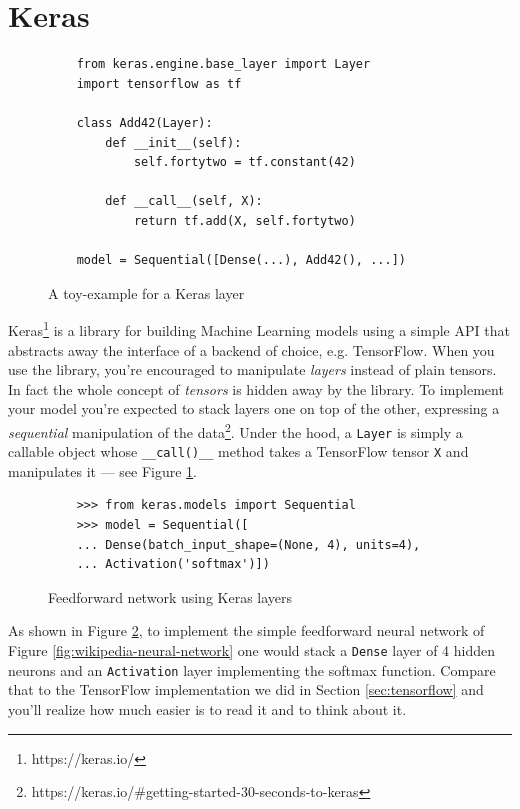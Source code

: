 \section{Keras}
\label{sec:keras}

\begin{figure}
  \begin{verbatim}
    from keras.engine.base_layer import Layer
    import tensorflow as tf

    class Add42(Layer):
        def __init__(self):
            self.fortytwo = tf.constant(42)

        def __call__(self, X):
            return tf.add(X, self.fortytwo)

    model = Sequential([Dense(...), Add42(), ...])
  \end{verbatim}
  \caption{A toy-example for a Keras layer}
  \label{fig:toy-layer}
\end{figure}

Keras\footnote{https://keras.io/} is a library for building Machine
Learning models using a simple API that abstracts away the interface of
a backend of choice, e.g. TensorFlow. When you use the library, you're
encouraged to manipulate \emph{layers} instead of plain tensors. In
fact the whole concept of \emph{tensors} is hidden away by the library.
To implement your model you're expected to stack layers one on top of the
other, expressing a \emph{sequential} manipulation of the
data\footnote{https://keras.io/\#getting-started-30-seconds-to-keras}.
Under the hood, a \texttt{Layer} is simply a callable object whose
\texttt{\_\_call()\_\_} method takes a TensorFlow tensor \texttt{X} and
manipulates it --- see Figure \ref{fig:toy-layer}.

\begin{figure}
  \begin{verbatim}
    >>> from keras.models import Sequential
    >>> model = Sequential([
    ... Dense(batch_input_shape=(None, 4), units=4),
    ... Activation('softmax')])
  \end{verbatim}
  \caption{Feedforward network using Keras layers}
  \label{fig:feedforward-with-layers}
\end{figure}

As shown in Figure \ref{fig:feedforward-with-layers}, to implement the
simple feedforward neural network of Figure
\ref{fig:wikipedia-neural-network} one would stack a \texttt{Dense}
layer of 4 hidden neurons and an \texttt{Activation} layer implementing
the softmax function. Compare that to the TensorFlow implementation we
did in Section \ref{sec:tensorflow} and you'll realize how much easier
is to read it and to think about it.

